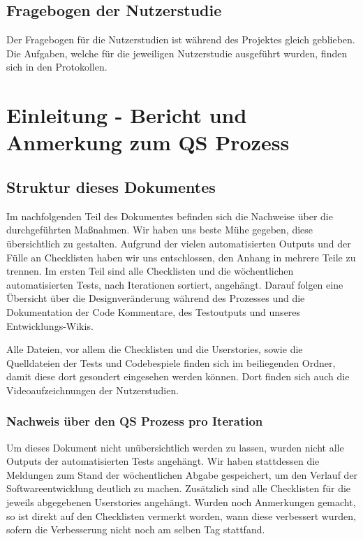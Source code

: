 \documentclass[accentcolor=tud0b,12pt,paper=a4]{tudreport}
\begin{document}
\section{Fragebogen der Nutzerstudie}
Der Fragebogen für die Nutzerstudien ist während des Projektes gleich geblieben. Die Aufgaben, welche für die jeweiligen Nutzerstudie ausgeführt wurden, finden sich in den Protokollen. 

	


\chapter{Einleitung - Bericht und Anmerkung zum QS Prozess}
\section{Struktur dieses Dokumentes}
Im nachfolgenden Teil des Dokumentes befinden sich die Nachweise über die durchgeführten Maßnahmen. Wir haben uns beste Mühe gegeben, diese übersichtlich zu gestalten. Aufgrund der vielen automatisierten Outputs und der Fülle an Checklisten haben wir uns entschlossen, den Anhang in mehrere Teile zu trennen. Im ersten Teil sind alle Checklisten und die wöchentlichen automatisierten Tests, nach Iterationen sortiert, angehängt. Darauf folgen eine Übersicht über die Designveränderung während des Prozesses und die Dokumentation der Code Kommentare, des Testoutputs und unseres Entwicklungs-Wikis.

Alle Dateien, vor allem die Checklisten und die Userstories, sowie die Quelldateien der Tests und Codebespiele finden sich im beiliegenden Ordner, damit diese dort gesondert eingesehen werden können. Dort finden sich auch die Videoaufzeichnungen der Nutzerstudien.

\subsection{Nachweis über den QS Prozess pro Iteration}
Um dieses Dokument nicht unübersichtlich werden zu lassen, wurden nicht alle Outputs der automatisierten Tests angehängt. Wir haben stattdessen die Meldungen zum Stand der wöchentlichen Abgabe gespeichert, um den Verlauf der Softwareentwicklung deutlich zu machen. Zusätzlich sind alle Checklisten für die jeweils abgegebenen Userstories angehängt. Wurden noch Anmerkungen gemacht, so ist direkt auf den Checklisten vermerkt worden, wann diese verbessert wurden, sofern die Verbesserung nicht noch am selben Tag stattfand.
\end{document}
